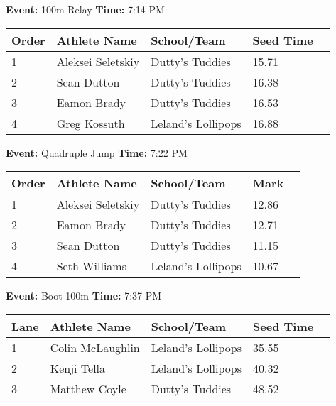 \documentclass[11pt]{article}
\begin{document}
\textbf{Event:} 100m Relay \quad \textbf{Time:} 7:14 PM 

\vspace{1em}
\begin{tabular}{@{}lllll@{}}
\toprule

\textbf{Order} & \textbf{Athlete Name} & \textbf{School/Team} & \textbf{Seed Time} \\
\midrule
1 & Aleksei Seletskiy & Dutty's Tuddies & 15.71 &\\
2 & Sean Dutton & Dutty's Tuddies & 16.38 &\\
3 & Eamon Brady & Dutty's Tuddies & 16.53 &\\
4 & Greg Kossuth & Leland's Lollipops & 16.88 &\\
\bottomrule
\end{tabular}
\vspace{2.5em}


\textbf{Event:} Quadruple Jump \quad \textbf{Time:} 7:22 PM 

\vspace{1em}
\begin{tabular}{@{}lllll@{}}
\toprule

\textbf{Order} & \textbf{Athlete Name} & \textbf{School/Team} & \textbf{Mark} \\
\midrule
1 & Aleksei Seletskiy & Dutty's Tuddies & 12.86 &\\
2 & Eamon Brady & Dutty's Tuddies & 12.71 &\\
3 & Sean Dutton & Dutty's Tuddies & 11.15 &\\
4 & Seth Williams & Leland's Lollipops & 10.67 &\\
\bottomrule
\end{tabular}
\vspace{2.5em}


\textbf{Event:} Boot 100m \quad \textbf{Time:} 7:37 PM 

\vspace{1em}
\begin{tabular}{@{}lllll@{}}
\toprule

\textbf{Lane} & \textbf{Athlete Name} & \textbf{School/Team} & \textbf{Seed Time} \\
\midrule
1 & Colin McLaughlin & Leland's Lollipops & 35.55 &\\
2 & Kenji Tella & Leland's Lollipops & 40.32 &\\
3 & Matthew Coyle & Dutty's Tuddies & 48.52 &\\
\bottomrule
\end{tabular}
\vspace{2.5em}
\end{document}
